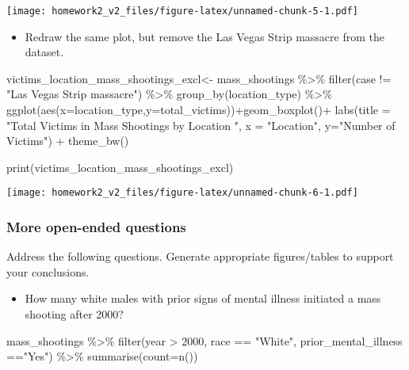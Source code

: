 \documentclass[
]{article}
\newenvironment{Shaded}{\begin{snugshade}}{\end{snugshade}}
\newcommand{\AttributeTok}[1]{\textcolor[rgb]{0.77,0.63,0.00}{#1}}
\newcommand{\DecValTok}[1]{\textcolor[rgb]{0.00,0.00,0.81}{#1}}
\newcommand{\FunctionTok}[1]{\textcolor[rgb]{0.00,0.00,0.00}{#1}}
\newcommand{\NormalTok}[1]{#1}
\newcommand{\OtherTok}[1]{\textcolor[rgb]{0.56,0.35,0.01}{#1}}
\newcommand{\SpecialCharTok}[1]{\textcolor[rgb]{0.00,0.00,0.00}{#1}}
\newcommand{\StringTok}[1]{\textcolor[rgb]{0.31,0.60,0.02}{#1}}
\providecommand{\tightlist}{%
  \setlength{\itemsep}{0pt}\setlength{\parskip}{0pt}}
\begin{document}
\texttt{[image: homework2\_v2\_files/figure-latex/unnamed-chunk-5-1.pdf]}

\begin{itemize}
\tightlist
\item
  Redraw the same plot, but remove the Las Vegas Strip massacre from the
  dataset.
\end{itemize}

\begin{Shaded}
\begin{Highlighting}[]
\NormalTok{victims\_location\_mass\_shootings\_excl}\OtherTok{\textless{}{-}}
\NormalTok{  mass\_shootings }\SpecialCharTok{\%\textgreater{}\%} 
  \FunctionTok{filter}\NormalTok{(case }\SpecialCharTok{!=} \StringTok{"Las Vegas Strip massacre"}\NormalTok{) }\SpecialCharTok{\%\textgreater{}\%} 
  \FunctionTok{group\_by}\NormalTok{(location\_type) }\SpecialCharTok{\%\textgreater{}\%} 
  \FunctionTok{ggplot}\NormalTok{(}\FunctionTok{aes}\NormalTok{(}\AttributeTok{x=}\NormalTok{location\_type,}\AttributeTok{y=}\NormalTok{total\_victims))}\SpecialCharTok{+}\FunctionTok{geom\_boxplot}\NormalTok{()}\SpecialCharTok{+}
\FunctionTok{labs}\NormalTok{(}\AttributeTok{title =} \StringTok{"Total Victims in Mass Shootings by Location "}\NormalTok{,}
       \AttributeTok{x =} \StringTok{"Location"}\NormalTok{, }\AttributeTok{y=}\StringTok{"Number of Victims"}\NormalTok{) }\SpecialCharTok{+}
  \FunctionTok{theme\_bw}\NormalTok{()}

\FunctionTok{print}\NormalTok{(victims\_location\_mass\_shootings\_excl)}
\end{Highlighting}
\end{Shaded}

\texttt{[image: homework2\_v2\_files/figure-latex/unnamed-chunk-6-1.pdf]}

\hypertarget{more-open-ended-questions}{%
\subsubsection{More open-ended
questions}\label{more-open-ended-questions}}

Address the following questions. Generate appropriate figures/tables to
support your conclusions.

\begin{itemize}
\tightlist
\item
  How many white males with prior signs of mental illness initiated a
  mass shooting after 2000?
\end{itemize}

\begin{Shaded}
\begin{Highlighting}[]
\NormalTok{mass\_shootings }\SpecialCharTok{\%\textgreater{}\%}
  \FunctionTok{filter}\NormalTok{(year }\SpecialCharTok{\textgreater{}} \DecValTok{2000}\NormalTok{, race }\SpecialCharTok{==} \StringTok{"White"}\NormalTok{, prior\_mental\_illness }\SpecialCharTok{==}\StringTok{"Yes"}\NormalTok{) }\SpecialCharTok{\%\textgreater{}\%} 
  \FunctionTok{summarise}\NormalTok{(}\AttributeTok{count=}\FunctionTok{n}\NormalTok{())}
\end{Highlighting}
\end{Shaded}
\end{document}
